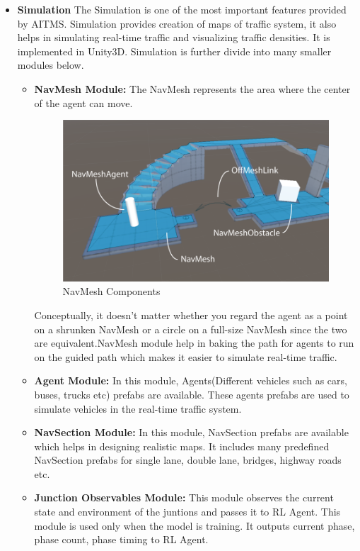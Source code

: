 \documentclass[openany,12pt]{report}
\begin{document}
		\begin{itemize}
			
			\item{\textbf{Simulation} The Simulation is one of the most important features provided by AITMS. Simulation provides creation of maps of traffic system, it also helps in simulating real-time traffic and visualizing traffic densities. It is implemented in Unity3D. Simulation is further divide into many smaller modules below. \begin{itemize}
			\item{\textbf{NavMesh Module:} The NavMesh represents the area where the center of the agent can move. 
			\begin{figure}[H]
				\centering
				\includegraphics[width=3 in]{./Diagrams/PNG/NavMeshModule}
				\caption{NavMesh Components}
			\end{figure}
			Conceptually, it doesn’t matter whether you regard the agent as a point on a shrunken NavMesh or a circle on a full-size NavMesh since the two are equivalent.NavMesh module help in baking the path for agents to run on the guided path which makes it easier to simulate real-time traffic.}
			
			\item{\textbf{Agent Module:} In this module, Agents(Different vehicles such as cars, buses, trucks etc) prefabs are available. These agents prefabs are used to simulate vehicles in the real-time traffic system.}
			\item{\textbf{NavSection Module:} In this module, NavSection prefabs are available which helps in designing realistic maps. It includes many predefined NavSection prefabs for single lane, double lane, bridges, highway roads etc. }
			\item{\textbf{Junction Observables Module:} This module observes the current state and environment of the juntions and passes it to RL Agent. This module is used only when the model is training. It outputs current phase, phase count, phase timing  to RL Agent.}
			\end{itemize}			 
			}
			

\end{itemize}
\end{document}
